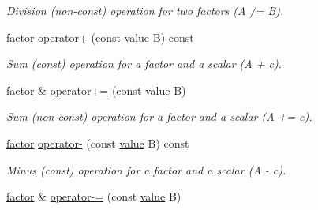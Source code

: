 \begin{DoxyCompactItemize}
\begin{DoxyCompactList}\small\item\em Division (non-\/const) operation for two factors (A /= B). \end{DoxyCompactList}\item 
\hypertarget{classmerlin_1_1factor_a511ab1230070c551f3df9bfbb0ccd271}{}\hyperlink{classmerlin_1_1factor}{factor} \hyperlink{classmerlin_1_1factor_a511ab1230070c551f3df9bfbb0ccd271}{operator+} (const \hyperlink{classmerlin_1_1factor_a1b14d19e509403448fbef26b003c9281}{value} B) const \label{classmerlin_1_1factor_a511ab1230070c551f3df9bfbb0ccd271}

\begin{DoxyCompactList}\small\item\em Sum (const) operation for a factor and a scalar (A + c). \end{DoxyCompactList}\item 
\hypertarget{classmerlin_1_1factor_a21ca9eaf0481b37777d452ffdd19a377}{}\hyperlink{classmerlin_1_1factor}{factor} \& \hyperlink{classmerlin_1_1factor_a21ca9eaf0481b37777d452ffdd19a377}{operator+=} (const \hyperlink{classmerlin_1_1factor_a1b14d19e509403448fbef26b003c9281}{value} B)\label{classmerlin_1_1factor_a21ca9eaf0481b37777d452ffdd19a377}

\begin{DoxyCompactList}\small\item\em Sum (non-\/const) operation for a factor and a scalar (A += c). \end{DoxyCompactList}\item 
\hypertarget{classmerlin_1_1factor_ace6b3213cbafbf6f08a1a6da9a80a9f4}{}\hyperlink{classmerlin_1_1factor}{factor} \hyperlink{classmerlin_1_1factor_ace6b3213cbafbf6f08a1a6da9a80a9f4}{operator-\/} (const \hyperlink{classmerlin_1_1factor_a1b14d19e509403448fbef26b003c9281}{value} B) const \label{classmerlin_1_1factor_ace6b3213cbafbf6f08a1a6da9a80a9f4}

\begin{DoxyCompactList}\small\item\em Minus (const) operation for a factor and a scalar (A -\/ c). \end{DoxyCompactList}\item 
\hypertarget{classmerlin_1_1factor_ab2356cf9170a9ce9b36fd2cdbb9cd1cd}{}\hyperlink{classmerlin_1_1factor}{factor} \& \hyperlink{classmerlin_1_1factor_ab2356cf9170a9ce9b36fd2cdbb9cd1cd}{operator-\/=} (const \hyperlink{classmerlin_1_1factor_a1b14d19e509403448fbef26b003c9281}{value} B)\label{classmerlin_1_1factor_ab2356cf9170a9ce9b36fd2cdbb9cd1cd}


\end{DoxyCompactItemize}
